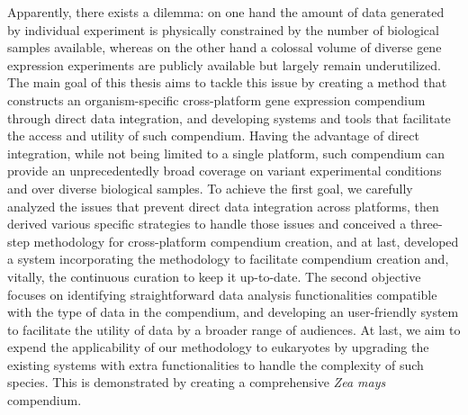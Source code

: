 

Apparently, there exists a dilemma: on one hand the amount of data generated by
individual experiment is physically constrained by the number of biological
samples available, whereas on the other hand a colossal volume of diverse gene
expression experiments are publicly available but largely remain underutilized.
%
The main goal of this thesis aims to tackle this issue by creating a method
that constructs an organism-specific cross-platform gene expression compendium
through direct data integration, and developing systems and tools that
facilitate the access and utility of such compendium.
%
Having the advantage of direct integration, while not being limited to a single
platform, such compendium can provide an unprecedentedly broad coverage on
variant experimental conditions and over diverse biological samples.
%
To achieve the first goal, we carefully analyzed the issues that prevent direct
data integration across platforms, then derived various specific strategies to
handle those issues and conceived a three-step methodology for cross-platform
compendium creation, and at last, developed a system incorporating the
methodology to facilitate compendium creation and, vitally, the continuous
curation to keep it up-to-date.
%
The second objective focuses on identifying straightforward data analysis
functionalities compatible with the type of data in the compendium, and
developing an user-friendly system to facilitate the utility of data by a
broader range of audiences.
%
At last, we aim to expend the applicability of our methodology to eukaryotes by
upgrading the existing systems with extra functionalities to handle the
complexity of such species.
%
This is demonstrated by creating a comprehensive \textit{Zea mays} compendium.


